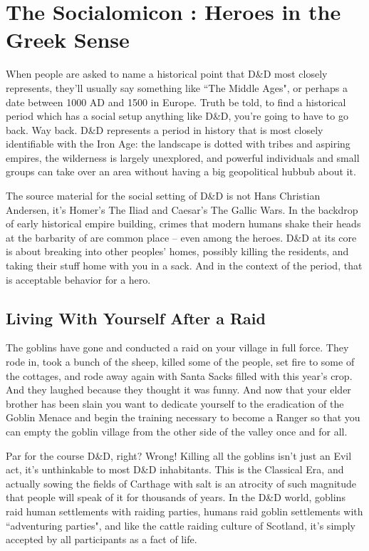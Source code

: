 \chapter{The Socialomicon : Heroes in the Greek Sense}
\vspace*{-10pt}

When people are asked to name a historical point that D\&D most closely represents, they'll usually say something like ``The Middle Ages", or perhaps a date between 1000 AD and 1500 in Europe. Truth be told, to find a historical period which has a social setup anything like D\&D, you're going to have to go back. Way back. D\&D represents a period in history that is most closely identifiable with the Iron Age: the landscape is dotted with tribes and aspiring empires, the wilderness is largely unexplored, and powerful individuals and small groups can take over an area without having a big geopolitical hubbub about it.

The source material for the social setting of D\&D is not Hans Christian Andersen, it's Homer's The Iliad and Caesar's The Gallic Wars. In the backdrop of early historical empire building, crimes that modern humans shake their heads at the barbarity of are common place -- even among the heroes. D\&D at its core is about breaking into other peoples' homes, possibly killing the residents, and taking their stuff home with you in a sack. And in the context of the period, that is acceptable behavior for a hero.

\section{Living With Yourself After a Raid}

The goblins have gone and conducted a raid on your village in full force. They rode in, took a bunch of the sheep, killed some of the people, set fire to some of the cottages, and rode away again with Santa Sacks filled with this year's crop. And they laughed because they thought it was funny. And now that your elder brother has been slain you want to dedicate yourself to the eradication of the Goblin Menace and begin the training necessary to become a Ranger so that you can empty the goblin village from the other side of the valley once and for all.

Par for the course D\&D, right? Wrong! Killing all the goblins isn't just an Evil act, it's unthinkable to most D\&D inhabitants. This is the Classical Era, and actually sowing the fields of Carthage with salt is an atrocity of such magnitude that people will speak of it for thousands of years. In the D\&D world, goblins raid human settlements with raiding parties, humans raid goblin settlements with ``adventuring parties", and like the cattle raiding culture of Scotland, it's simply accepted by all participants as a fact of life.

